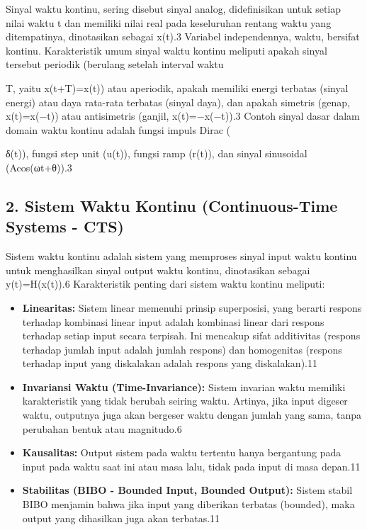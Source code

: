 \documentclass[
  letterpaper,
  DIV=11,
  numbers=noendperiod]{scrreprt}
\begin{document}
Sinyal waktu kontinu, sering disebut sinyal analog, didefinisikan untuk
setiap nilai waktu t dan memiliki nilai real pada keseluruhan rentang
waktu yang ditempatinya, dinotasikan sebagai x(t).3 Variabel
independennya, waktu, bersifat kontinu. Karakteristik umum sinyal waktu
kontinu meliputi apakah sinyal tersebut periodik (berulang setelah
interval waktu

T, yaitu x(t+T)=x(t)) atau aperiodik, apakah memiliki energi terbatas
(sinyal energi) atau daya rata-rata terbatas (sinyal daya), dan apakah
simetris (genap, x(t)=x(−t)) atau antisimetris (ganjil, x(t)=−x(−t)).3
Contoh sinyal dasar dalam domain waktu kontinu adalah fungsi impuls
Dirac (

δ(t)), fungsi step unit (u(t)), fungsi ramp (r(t)), dan sinyal
sinusoidal (Acos(ωt+θ)).3

\subsection{2. Sistem Waktu Kontinu (Continuous-Time Systems -
CTS)}\label{sistem-waktu-kontinu-continuous-time-systems---cts}

Sistem waktu kontinu adalah sistem yang memproses sinyal input waktu
kontinu untuk menghasilkan sinyal output waktu kontinu, dinotasikan
sebagai y(t)=H(x(t)).6 Karakteristik penting dari sistem waktu kontinu
meliputi:

\begin{itemize}
\item
  \textbf{Linearitas:} Sistem linear memenuhi prinsip superposisi, yang
  berarti respons terhadap kombinasi linear input adalah kombinasi
  linear dari respons terhadap setiap input secara terpisah. Ini
  mencakup sifat additivitas (respons terhadap jumlah input adalah
  jumlah respons) dan homogenitas (respons terhadap input yang
  diskalakan adalah respons yang diskalakan).11
\item
  \textbf{Invariansi Waktu (Time-Invariance):} Sistem invarian waktu
  memiliki karakteristik yang tidak berubah seiring waktu. Artinya, jika
  input digeser waktu, outputnya juga akan bergeser waktu dengan jumlah
  yang sama, tanpa perubahan bentuk atau magnitudo.6
\item
  \textbf{Kausalitas:} Output sistem pada waktu tertentu hanya
  bergantung pada input pada waktu saat ini atau masa lalu, tidak pada
  input di masa depan.11
\item
  \textbf{Stabilitas (BIBO - Bounded Input, Bounded Output):} Sistem
  stabil BIBO menjamin bahwa jika input yang diberikan terbatas
  (bounded), maka output yang dihasilkan juga akan terbatas.11
\end{itemize}
\end{document}
